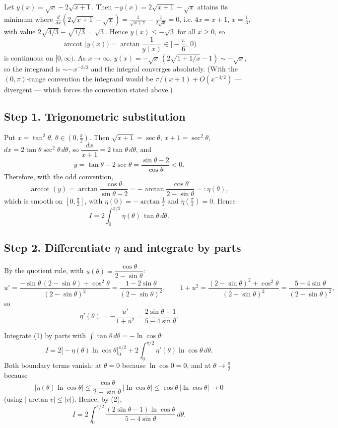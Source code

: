 \documentclass[11pt]{article}
\theoremstyle{remark}
\begin{document}
Let $y(x)=\sqrt x-2\sqrt{x+1}$. Then $-y(x)=2\sqrt{x+1}-\sqrt x$ attains its minimum where $\frac{d}{dx}(2\sqrt{x+1}-\sqrt x)=\frac{1}{\sqrt{x+1}}-\frac{1}{2\sqrt x}=0$, i.e. $4x=x+1$, $x=\frac13$, with value $2\sqrt{4/3}-\sqrt{1/3}=\sqrt3$. Hence $y(x)\le-\sqrt3$ for all $x\ge0$, so
\[\operatorname{arccot}\big(y(x)\big)=\arctan\frac{1}{y(x)}\in\Big[-\frac\pi6,\,0\Big)\]
is continuous on $[0,\infty)$. As $x\to\infty$, $y(x)=-\sqrt x\,(2\sqrt{1+1/x}-1)\sim-\sqrt x$, so the integrand is $\sim -x^{-3/2}$ and the integral converges absolutely. (With the $(0,\pi)$-range convention the integrand would be $\pi/(x+1)+O(x^{-3/2})$ --- divergent --- which forces the convention stated above.)

\subsection*{Step 1. Trigonometric substitution}

Put $x=\tan^2\theta$, $\theta\in(0,\tfrac\pi2)$. Then $\sqrt{x+1}=\sec\theta$, $x+1=\sec^2\theta$, $dx=2\tan\theta\sec^2\theta\,d\theta$, so $\dfrac{dx}{x+1}=2\tan\theta\,d\theta$, and
\[y=\tan\theta-2\sec\theta=\frac{\sin\theta-2}{\cos\theta}<0 .\]
Therefore, with the odd convention,
\[\operatorname{arccot}(y)=\arctan\frac{\cos\theta}{\sin\theta-2}
=-\arctan\frac{\cos\theta}{2-\sin\theta}=:\eta(\theta),\]
which is smooth on $[0,\tfrac\pi2]$, with $\eta(0)=-\arctan\tfrac12$ and $\eta(\tfrac\pi2)=0$. Hence
\begin{equation}
I=2\int_0^{\pi/2}\eta(\theta)\,\tan\theta\,d\theta. \tag{1}
\end{equation}

\subsection*{Step 2. Differentiate $\eta$ and integrate by parts}

By the quotient rule, with $u(\theta)=\dfrac{\cos\theta}{2-\sin\theta}$:
\[u'=\frac{-\sin\theta\,(2-\sin\theta)+\cos^2\theta}{(2-\sin\theta)^2}
=\frac{1-2\sin\theta}{(2-\sin\theta)^2},\qquad
1+u^2=\frac{(2-\sin\theta)^2+\cos^2\theta}{(2-\sin\theta)^2}=\frac{5-4\sin\theta}{(2-\sin\theta)^2},\]
so
\begin{equation}
\eta'(\theta)=-\frac{u'}{1+u^2}=\frac{2\sin\theta-1}{5-4\sin\theta}. \tag{2}
\end{equation}

Integrate (1) by parts with $\int\tan\theta\,d\theta=-\ln\cos\theta$:
\[I=2\Big[-\eta(\theta)\ln\cos\theta\Big]_0^{\pi/2}+2\int_0^{\pi/2}\eta'(\theta)\ln\cos\theta\,d\theta .\]
Both boundary terms vanish: at $\theta=0$ because $\ln\cos0=0$, and at $\theta\to\tfrac\pi2$ because
\[|\eta(\theta)\ln\cos\theta|\le\frac{\cos\theta}{2-\sin\theta}\,|\ln\cos\theta|\le\cos\theta\,|\ln\cos\theta|\longrightarrow0\]
(using $|\arctan v|\le|v|$). Hence, by (2),
\begin{equation}
I=2\int_0^{\pi/2}\frac{(2\sin\theta-1)\ln\cos\theta}{5-4\sin\theta}\,d\theta. \tag{3}
\end{equation}
\end{document}
